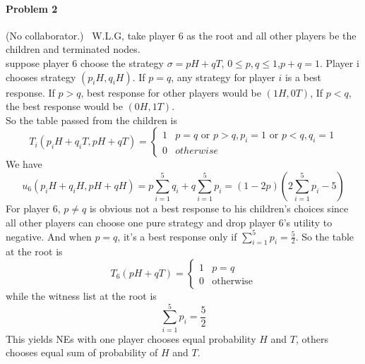\documentclass[12pt]{article}
\begin{document}
\paragraph{Problem 2} (No collaborator.)
\
W.L.G, 
take player 6 as the root and all other players be the children and terminated nodes.
\\
suppose player $6$ choose the strategy $\sigma = pH + qT$, $0 \leq p,q \leq 1$,$p+q=1$.
Player i chooses strategy $(p_iH,q_iH)$.
If $p=q$, any strategy for player $i$ is a best response.
If $p>q$, best response for other players would be $(1H,0T)$,
If $p<q$, the best response would be $(0H,1T)$.
\\
So the  table passed from the children is 
$$
T_i(p_i H+q_i T,pH+qT)=\left\{\begin{array}{ll}
1 & p=q\mbox{ or }p>q, p_i=1\mbox{ or }p<q, q_i=1\\
0 & {otherwise}
\end{array}\right .
$$
We have 
$$u_6(p_iH+q_iH,pH+qH)=p\sum_{i=1}^{5}q_i+q\sum_{i=1}^{5}p_i=(1-2p)(2\sum_{i=1}^{5}p_i-5)$$
For player $6$, $p\not=q$ is obvious not a best response to his children's choices
since all other players can choose one pure strategy and drop player $6$'s utility to negative.
And when $p=q$, it's a best response only if $\sum_{i=1}^{5}p_i=\frac{5}{2}$.
So the table at the root is
$$
T_6(pH+qT)=\left\{\begin{array}{ll}
	1 & p=q\\
	0 & \mbox{otherwise}
\end{array}\right .
$$
while the witness list at the root is 
$$ \sum_{i=1}^{5}p_i=\frac{5}{2}$$
This yields NEs with one player chooses equal probability $H$ and $T$, others chooses equal sum of probability of $H$ and $T$.

\bigskip
\end{document}
